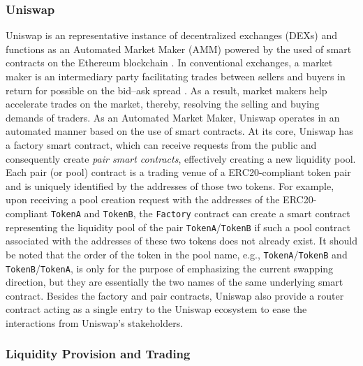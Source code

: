 \subsubsection{Uniswap}

Uniswap is an representative instance of decentralized exchanges (DEXs) and functions as an Automated Market Maker (AMM) powered by the used of smart contracts on the Ethereum blockchain \cite{HowUniswapWorks}. In conventional exchanges, a market maker is an intermediary party facilitating trades between sellers and buyers in return for possible on the bid–ask spread \cite{robertInvestmentConcepts}. As a result, market makers help accelerate trades on the market, thereby, resolving the selling and buying demands of traders. As an Automated Market Maker, Uniswap operates in an automated manner based on the use of smart contracts. At its core, Uniswap has a factory smart contract, which can receive requests from the public and consequently create \textit{pair smart contracts}, effectively creating a new liquidity pool. Each pair (or pool)  contract is a trading venue of a ERC20-compliant token pair and is uniquely identified by the addresses of those two tokens. For example, upon receiving a pool creation request with the addresses of the ERC20-compliant \texttt{TokenA} and \texttt{TokenB}, the \texttt{Factory} contract can create a smart contract representing the liquidity pool of the pair \texttt{TokenA}/\texttt{TokenB} if such a pool contract associated with the addresses of these two tokens does not already exist. It should be noted that the order of the token in the  pool name, e.g., \texttt{TokenA}/\texttt{TokenB} and \texttt{TokenB}/\texttt{TokenA}, is only for the purpose of emphasizing the current swapping direction, but they are essentially the two names of the same underlying smart contract. Besides the factory and pair contracts, Uniswap also provide a router contract acting as a single entry to the Uniswap ecosystem to ease the interactions from Uniswap's stakeholders.


\subsubsection{Liquidity Provision and Trading}

